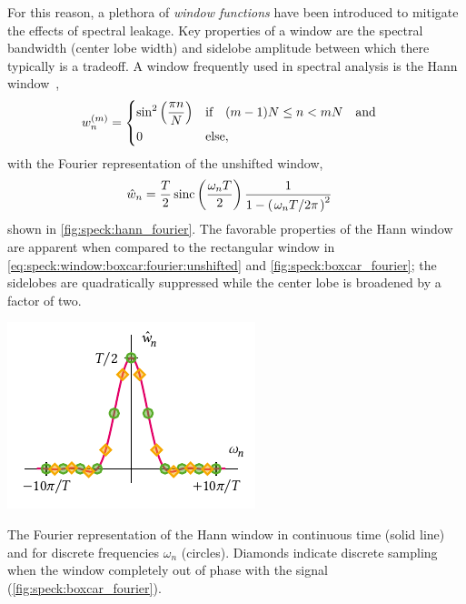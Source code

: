 For this reason, a plethora of \emph{window functions} have been introduced to mitigate the effects of spectral leakage.
Key properties of a window are the spectral bandwidth (center lobe width) and sidelobe amplitude between which there typically is a tradeoff.
A window frequently used in spectral analysis is the Hann window~\cite{Nuttall1981},
\begin{align}\label{eq:speck:window:hann}
    w_n\gth{m} =
    \begin{dcases}
        \sin^2\left(\frac{\pi n}{N}\right) &\qif* (m - 1)N\leq n < mN\qand \\
        0 &\text{else},
    \end{dcases}
\end{align}
with the Fourier representation of the unshifted window,
\begin{align}\label{eq:speck:window:hann:fourier_unshifted}
    \hat{w}_n &= \frac{T}{2}\sinc\left(\frac{\omega_n T}{2}\right)
                    \frac{1}{1 - \left(\flatfrac{\omega_n T}{2\pi}\right)^2}
\end{align}
shown in \cref{fig:speck:hann_fourier}.
The favorable properties of the Hann window are apparent when compared to the rectangular window in \cref{eq:speck:window:boxcar:fourier:unshifted} and \cref{fig:speck:boxcar_fourier}; the sidelobes are quadratically suppressed while the center lobe is broadened by a factor of two.

\begin{marginfigure}
    \centering
    \includegraphics{img/pdf/spectrometer/hann}
    \caption[]{
        The Fourier representation of the Hann window in continuous time (solid line) and for discrete frequencies $\omega_n$ (circles).
        Diamonds indicate discrete sampling when the window completely out of phase with the signal (\cf \cref{fig:speck:boxcar_fourier}).
    }
    \label{fig:speck:hann_fourier}
\end{marginfigure}

